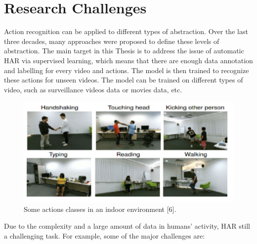 \section{Research Challenges}
\hspace{5mm} Action recognition can be applied to different types of abstraction. Over the last three decades, many approaches were proposed to define these levels of abstraction. The main target in this Thesis is to address the issue of automatic HAR via supervised learning, which means that there are enough data annotation and labelling for every video and actions. The model is then trained to recognize these actions for unseen videos. The model can be trained on different types of video, such as surveillance videos data or movies data, etc.
\begin{figure}[ht]
\centering
\includegraphics{Figures/ti.PNG}
\decoRule
\caption[Some actions classes in an indoor environment "6"]{Some actions classes in an indoor environment [6].}
\label{fig:la}
\end{figure}
Due to the complexity and a large amount of data in humans’ activity, HAR still a challenging task. For example, some of the major challenges are:
